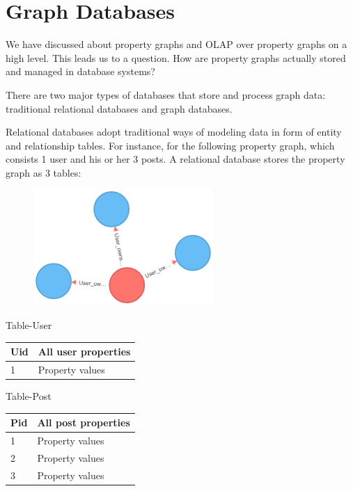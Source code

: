 \section{Graph Databases}


We have discussed about property graphs and OLAP over property graphs on a high level. This leads us to a question. How are property graphs actually stored and managed in database systems? 
 
There are two major types of databases that store and process graph data: traditional relational databases and graph databases. 
 
Relational databases adopt traditional ways of modeling data in form of entity and relationship tables. For instance, for the following property graph, which consists 1 user and his or her 3 posts. A relational database stores the property graph as 3 tables:

\begin {figure}[H]
\centering
\includegraphics[scale=0.9]{pic/4.png}
\end{figure}

Table-User
\begin{center}
\begin{tabular}{ l | l }  
	Uid	&{All user properties}	\\ \hline 
	1	&{Property values} \\
\end{tabular}
\end {center}

Table-Post
\begin{center}
	\begin{tabular}{ l | l }  
		Pid	& {All post properties}	\\ \hline 
		1	&{Property values} \\
		2	&{Property values} \\
		3	&{Property values} \\
	\end{tabular}
	\end {center}	
 

